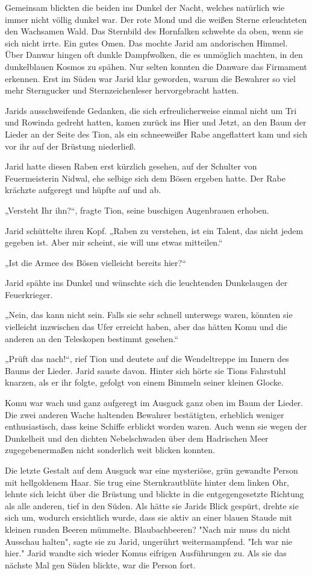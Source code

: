 Gemeinsam blickten die beiden ins Dunkel der Nacht, welches natürlich wie immer nicht völlig dunkel war. Der rote Mond und die weißen Sterne erleuchteten den Wachsamen Wald. Das Sternbild des Hornfalken schwebte da oben, wenn sie sich nicht irrte. Ein gutes Omen. Das mochte Jarid am andorischen Himmel. Über Danwar hingen oft dunkle Dampfwolken, die es unmöglich machten, in den dunkelblauen Kosmos zu spähen. Nur selten konnten die Danware das Firmament erkennen. Erst im Süden war Jarid klar geworden, warum die Bewahrer so viel mehr Sterngucker und Sternzeichenleser hervorgebracht hatten.

Jarids ausschweifende Gedanken, die sich erfreulicherweise einmal nicht um Tri und Rowinda gedreht hatten, kamen zurück ins Hier und Jetzt, an den Baum der Lieder an der Seite des Tion, als ein schneeweißer Rabe angeflattert kam und sich vor ihr auf der Brüstung niederließ.

Jarid hatte diesen Raben erst kürzlich gesehen, auf der Schulter von Feuermeisterin Nidwal, ehe selbige sich dem Bösen ergeben hatte. Der Rabe krächzte aufgeregt und hüpfte auf und ab.

„Versteht Ihr ihn?“, fragte Tion, seine buschigen Augenbrauen erhoben.

Jarid schüttelte ihren Kopf. „Raben zu verstehen, ist ein Talent, das nicht jedem gegeben ist. Aber mir scheint, sie will uns etwas mitteilen.“

„Ist die Armee des Bösen vielleicht bereits hier?“

Jarid spähte ins Dunkel und wünschte sich die leuchtenden Dunkelaugen der Feuerkrieger.

„Nein, das kann nicht sein. Falls sie sehr schnell unterwegs waren, könnten sie vielleicht inzwischen das Ufer erreicht haben, aber das hätten Komu und die anderen an den Teleskopen bestimmt gesehen.“

„Prüft das nach!“, rief Tion und deutete auf die Wendeltreppe im Innern des Baums der Lieder. Jarid sauste davon. Hinter sich hörte sie Tions Fahrstuhl knarzen, als er ihr folgte, gefolgt von einem Bimmeln seiner kleinen Glocke.

Komu war wach und ganz aufgeregt im Ausguck ganz oben im Baum der Lieder. Die zwei anderen Wache haltenden Bewahrer bestätigten, erheblich weniger enthusiastisch, dass keine Schiffe erblickt worden waren. Auch wenn sie wegen der Dunkelheit und den dichten Nebelschwaden über dem Hadrischen Meer zugegebenermaßen nicht sonderlich weit blicken konnten.

Die letzte Gestalt auf dem Ausguck war eine mysteriöse, grün gewandte Person mit hellgoldenem Haar. Sie trug eine Sternkrautblüte hinter dem linken Ohr, lehnte sich leicht über die Brüstung und blickte in die entgegengesetzte Richtung als alle anderen, tief in den Süden. Als hätte sie Jarids Blick gespürt, drehte sie sich um, wodurch ersichtlich wurde, dass sie aktiv an einer blauen Staude mit kleinen runden Beeren mümmelte. Blaubachbeeren? "Nach mir muss du nicht Ausschau halten", sagte sie zu Jarid, ungerührt weitermampfend. "Ich war nie hier." Jarid wandte sich wieder Komus eifrigen Ausführungen zu. Als sie das nächste Mal gen Süden blickte, war die Person fort.

